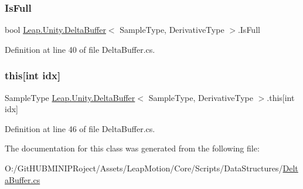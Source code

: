 \subsubsection{\texorpdfstring{IsFull}{IsFull}}
{\footnotesize\ttfamily bool \mbox{\hyperlink{class_leap_1_1_unity_1_1_delta_buffer}{Leap.\+Unity.\+Delta\+Buffer}}$<$ Sample\+Type, Derivative\+Type $>$.Is\+Full\hspace{0.3cm}{\ttfamily [get]}}



Definition at line 40 of file Delta\+Buffer.\+cs.

\mbox{\label{class_leap_1_1_unity_1_1_delta_buffer_a2a84d086d6edb34a7f6c249cea7b4acf}} 
\subsubsection{\texorpdfstring{this[int idx]}{this[int idx]}}
{\footnotesize\ttfamily Sample\+Type \mbox{\hyperlink{class_leap_1_1_unity_1_1_delta_buffer}{Leap.\+Unity.\+Delta\+Buffer}}$<$ Sample\+Type, Derivative\+Type $>$.this\mbox{[}int idx\mbox{]}\hspace{0.3cm}{\ttfamily [get]}}



Definition at line 46 of file Delta\+Buffer.\+cs.



The documentation for this class was generated from the following file\+:\begin{DoxyCompactItemize}
\item 
O\+:/\+Git\+H\+U\+B\+M\+I\+N\+I\+P\+Roject/\+Assets/\+Leap\+Motion/\+Core/\+Scripts/\+Data\+Structures/\mbox{\hyperlink{_delta_buffer_8cs}{Delta\+Buffer.\+cs}}\end{DoxyCompactItemize}
